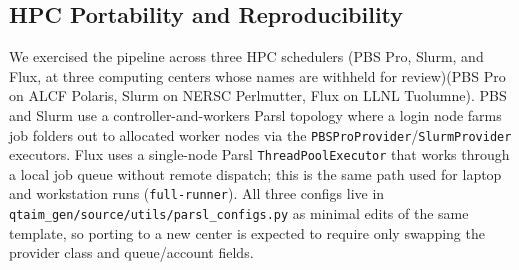 %
%
%
%
%

\subsection{HPC Portability and Reproducibility}

We exercised the pipeline across three HPC schedulers \ifanon(PBS Pro, Slurm, and Flux, at
three computing centers whose names are withheld for review)\else(PBS Pro on ALCF Polaris,
Slurm on NERSC Perlmutter, Flux on LLNL Tuolumne)\fi. PBS and Slurm use a controller-and-workers Parsl
topology where a login node farms job folders out to allocated worker nodes via the
\texttt{PBSProProvider}/\texttt{SlurmProvider} executors. Flux uses a single-node Parsl
\texttt{ThreadPoolExecutor} that works through a local job queue without remote dispatch;
this is the same path used for laptop and workstation runs (\texttt{full-runner}). All
three configs live in \texttt{qtaim\_gen/source/utils/parsl\_configs.py} as minimal edits of
the same template, so porting to a new center is expected to require only swapping the
provider class and queue/account fields.

